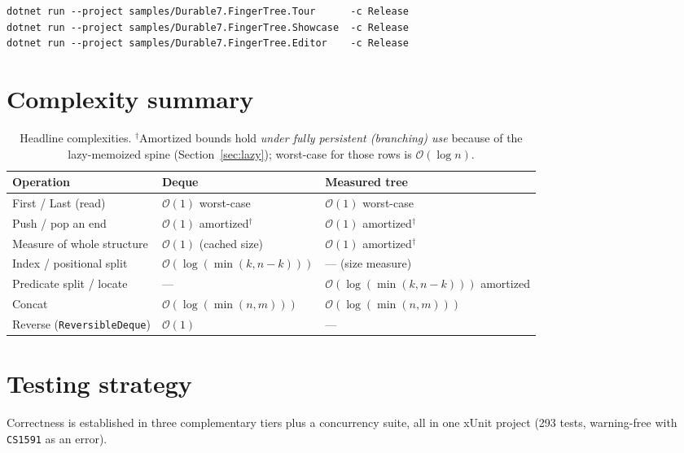 \documentclass[11pt]{article}
\newcommand{\cs}[1]{\lstinline|#1|}
\newcommand{\bigO}{\ensuremath{\mathcal{O}}}
\begin{document}
\begin{lstlisting}[language={}]
dotnet run --project samples/Durable7.FingerTree.Tour      -c Release
dotnet run --project samples/Durable7.FingerTree.Showcase  -c Release
dotnet run --project samples/Durable7.FingerTree.Editor    -c Release
\end{lstlisting}

\clearpage
\section{Complexity summary}
\label{sec:complexitysummary}

\begin{table}[ht]
\centering
\renewcommand{\arraystretch}{1.15}
\begin{tabular}{@{}lll@{}}
\toprule
\textbf{Operation} & \textbf{Deque} & \textbf{Measured tree} \\
\midrule
First / Last (read)        & $\bigO(1)$ worst-case          & $\bigO(1)$ worst-case \\
Push / pop an end          & $\bigO(1)$ amortized$^\dagger$ & $\bigO(1)$ amortized$^\dagger$ \\
Measure of whole structure & $\bigO(1)$ (cached size)       & $\bigO(1)$ amortized$^\dagger$ \\
Index / positional split   & $\bigO(\log(\min(k,n{-}k)))$   & --- (size measure) \\
Predicate split / locate   & ---                            & $\bigO(\log(\min(k,n{-}k)))$ amortized \\
Concat                     & $\bigO(\log(\min(n,m)))$       & $\bigO(\log(\min(n,m)))$ \\
Reverse (\cs{ReversibleDeque}) & $\bigO(1)$                 & --- \\
\bottomrule
\end{tabular}
\caption{Headline complexities. $^\dagger$Amortized bounds hold \emph{under fully persistent (branching)
use} because of the lazy-memoized spine (Section~\ref{sec:lazy}); worst-case for those rows is
$\bigO(\log n)$.}
\label{tab:complexity}
\end{table}

\section{Testing strategy}
\label{sec:testing}

Correctness is established in three complementary tiers plus a concurrency suite, all in one xUnit project
(293 tests, warning-free with \cs{CS1591} as an error).
\end{document}
